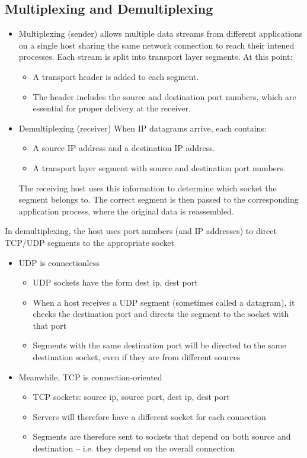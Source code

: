 \subsection{Multiplexing and Demultiplexing}
\begin{itemize}
  \item Multiplexing (sender) allows multiple data streams from different applications on a single host sharing the same network connection to reach their intened processes.
Each stream is split into transport layer segments. At this point:
    \begin{itemize}
      \item A transport header is added to each segment.
      \item The header includes the source and destination port numbers, which are essential for proper delivery at the receiver.
    \end{itemize}
\item Demultiplexing (receiver) When IP datagrams arrive, each contains:
  \begin{itemize}
    \item A source IP address and a destination IP address.
    \item A transport layer segment with source and destination port numbers.
  \end{itemize}
The receiving host uses this information to determine which socket the segment belongs to. The correct segment is then passed to the corresponding application process, where the original data is reassembled.
\end{itemize}

In demultiplexing, the host uses port numbers (and IP addresses) to direct TCP/UDP segments to the appropriate socket
\begin{itemize}
  \item UDP is connectionless
    \begin{itemize}
      \item UDP sockets have the form {dest ip, dest port}
      \item When a host receives a UDP segment (sometimes called a datagram), it checks the destination port and directs the segment to the socket with that port
      \item Segments with the same destination port will be directed to the same destination socket, even if they are from different sources
    \end{itemize}
  \item Meanwhile, TCP is connection-oriented
    \begin{itemize}
      \item TCP sockets: { source ip, source port, dest ip, dest port }
      \item Servers will therefore have a different socket for each connection
      \item Segments are therefore sent to sockets that depend on both source and destination – i.e. they depend on the overall connection
    \end{itemize}
\end{itemize}

